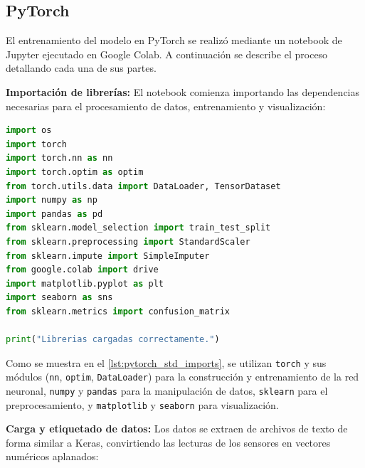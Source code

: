 \subsection{PyTorch}
El entrenamiento del modelo en PyTorch se realizó mediante un notebook de Jupyter ejecutado en Google Colab. A continuación se describe el proceso detallando cada una de sus partes.

\textbf{Importación de librerías:} El notebook comienza importando las dependencias necesarias para el procesamiento de datos, entrenamiento y visualización:

\begin{lstlisting}[language=Python, caption={Importación de librerías para el entrenamiento en PyTorch.}, label={lst:pytorch_std_imports}]
import os
import torch
import torch.nn as nn
import torch.optim as optim
from torch.utils.data import DataLoader, TensorDataset
import numpy as np
import pandas as pd
from sklearn.model_selection import train_test_split
from sklearn.preprocessing import StandardScaler
from sklearn.impute import SimpleImputer
from google.colab import drive
import matplotlib.pyplot as plt
import seaborn as sns
from sklearn.metrics import confusion_matrix

print("Librerias cargadas correctamente.")
\end{lstlisting}

Como se muestra en el \autoref{lst:pytorch_std_imports}, se utilizan \texttt{torch} y sus módulos (\texttt{nn}, \texttt{optim}, \texttt{DataLoader}) para la construcción y entrenamiento de la red neuronal, \texttt{numpy} y \texttt{pandas} para la manipulación de datos, \texttt{sklearn} para el preprocesamiento, y \texttt{matplotlib} y \texttt{seaborn} para visualización.

\textbf{Carga y etiquetado de datos:} Los datos se extraen de archivos de texto de forma similar a Keras, convirtiendo las lecturas de los sensores en vectores numéricos aplanados:

